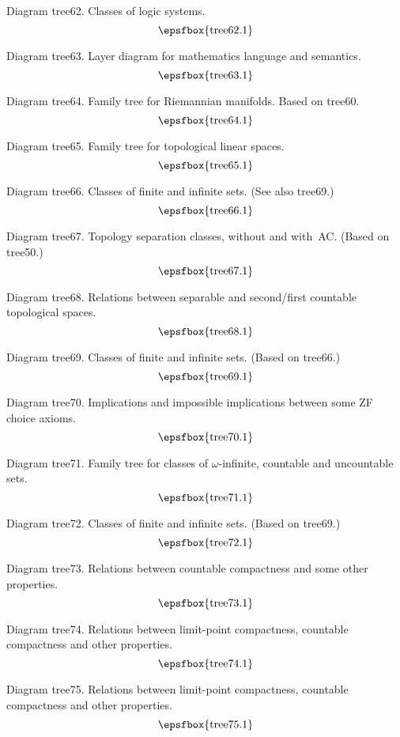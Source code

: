 \filleject

Diagram tree62. Classes of logic systems.
$$
\centerline{\epsfbox{tree62.1}}
$$

Diagram tree63. Layer diagram for mathematics language and semantics.
$$
\centerline{\epsfbox{tree63.1}}
$$

Diagram tree64. Family tree for Riemannian manifolds. Based on tree60.
$$
\centerline{\epsfbox{tree64.1}}
$$

Diagram tree65. Family tree for topological linear spaces.
$$
\centerline{\epsfbox{tree65.1}}
$$

\filleject

Diagram tree66. Classes of finite and infinite sets. (See also tree69.)
$$
\centerline{\epsfbox{tree66.1}}
$$

Diagram tree67. Topology separation classes, without and with~AC. (Based on
tree50.)
$$
\centerline{\epsfbox{tree67.1}}
$$

Diagram tree68. Relations between separable and second/first countable
topological spaces.
$$
\centerline{\epsfbox{tree68.1}}
$$

\filleject

Diagram tree69. Classes of finite and infinite sets. (Based on tree66.)
$$
\centerline{\epsfbox{tree69.1}}
$$

Diagram tree70. Implications and impossible implications between some ZF choice
axioms.
$$
\centerline{\epsfbox{tree70.1}}
$$

Diagram tree71. Family tree for classes of $\omega$-infinite, countable and
uncountable sets.
$$
\centerline{\epsfbox{tree71.1}}
$$

\filleject

Diagram tree72. Classes of finite and infinite sets. (Based on tree69.)
$$
\centerline{\epsfbox{tree72.1}}
$$

Diagram tree73. Relations between countable compactness and some other
properties.
$$
\centerline{\epsfbox{tree73.1}}
$$

Diagram tree74. Relations between limit-point compactness, countable compactness
and other properties.
$$
\centerline{\epsfbox{tree74.1}}
$$

Diagram tree75. Relations between limit-point compactness, countable compactness
and other properties.
$$
\centerline{\epsfbox{tree75.1}}
$$

